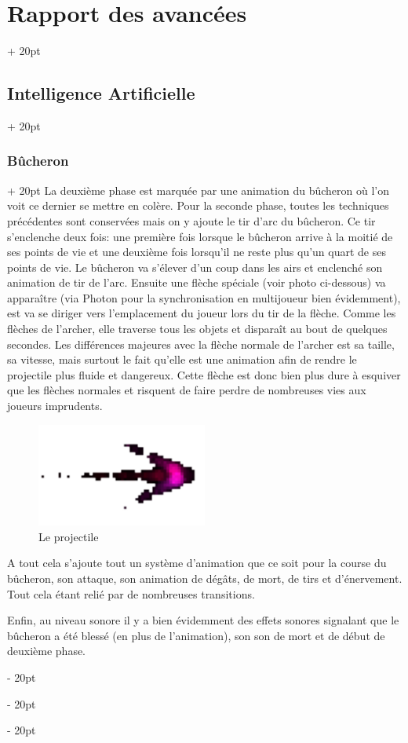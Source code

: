 \documentclass[a4paper, 12pt, twoside]{article}
\newcommand{\ind}[1][20pt]{\advance\leftskip + #1}
\newcommand{\deind}[1][20pt]{\advance\leftskip - #1}
\newenvironment{indt}[2][20pt]{#2 \par \ind[#1]}{\par \deind} %
\begin{document}
\begin{indt}{\section{Rapport des avancées}}
\begin{indt}{\subsection{Intelligence Artificielle}}
\begin{indt}{\subsubsection{Bûcheron}}
                La deuxième phase est marquée par une animation du bûcheron où l’on voit ce dernier se mettre en colère. Pour la seconde phase, toutes les techniques précédentes sont conservées mais on y ajoute le tir d’arc du bûcheron. Ce tir s'enclenche deux fois: une première fois lorsque le bûcheron arrive à la moitié de ses points de vie et une deuxième fois lorsqu’il ne reste plus qu’un quart de ses points de vie. Le bûcheron va s’élever d’un coup dans les airs et enclenché son animation de tir de l’arc. Ensuite une flèche spéciale (voir photo ci-dessous) va apparaître (via Photon pour la synchronisation en multijoueur bien évidemment), est va se diriger vers l'emplacement du joueur lors du tir de la flèche. Comme les flèches de l’archer, elle traverse tous les objets et disparaît au bout de quelques secondes. Les différences majeures avec la flèche normale de l’archer est sa taille, sa vitesse, mais surtout le fait qu’elle est une animation afin de rendre le projectile plus fluide et dangereux. Cette flèche est donc bien plus dure à esquiver que les flèches normales et risquent de faire perdre de nombreuses vies aux joueurs imprudents.

                \begin{figure}[h]
                    \centering
                    \includegraphics[width=0.5\textwidth]{Arrow.png}
                    \caption{Le projectile}
                    \label{fig:mesh1}
                \end{figure}

                A tout cela s’ajoute tout un système d’animation que ce soit pour la course du bûcheron, son attaque, son animation de dégâts, de mort, de tirs et d’énervement. Tout cela étant relié par de nombreuses transitions.

                Enfin, au niveau sonore il y a bien évidemment des effets sonores signalant que le bûcheron a été blessé (en plus de l’animation), son son de mort et de début de deuxième phase.
            \end{indt}
        \end{indt}


\end{indt}
\end{document}
